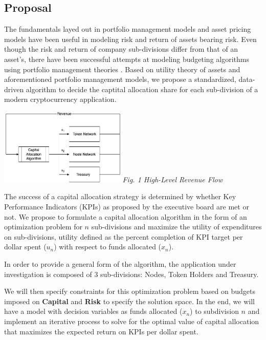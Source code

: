 \documentclass[conference,letterpaper]{IEEEtran}
\begin{document}
        \subsection{Proposal}
            The fundamentals layed out in portfolio management models and asset pricing
            models \cite{portfolioSelection} have been useful in modeling risk and return
            of assets bearing risk. Even though the risk and return of company
            sub-divisions differ from that of an asset's, there have been successful
            attempts at modeling budgeting algorithms using portfolio management theories
            \cite{cetingoz}. Based on utility theory of assets and aforementioned
            portfolio management models, we propose a standardized, data-driven algorithm
            to decide the captital allocation share for each sub-division of a modern
            cryptocurrency application.
            \begin{center}
                \includegraphics[width=0.45\textwidth]{assets/high_level_capital_allocation.png}
                \textit{Fig. 1 High-Level Revenue Flow}
            \end{center}
            The success of a capital allocation strategy is determined by whether Key
            Performance Indicators (KPIs) as proposed by the executive board are met or
            not. We propose to formulate a capital allocation algorithm in the form of an
            optimization problem for $n$ sub-divisions and maximize the utility of
            expenditures on sub-divisions, utility defined as the percent completion of
            KPI target per dollar spent ($u_n$) with respect to funds allocated ($x_n$). 
            
            In order to provide a general form of the algorithm, the application under
            investigation is composed of 3 sub-divisions: Nodes, Token Holders and
            Treasury.
            
            We will then specify constraints for this optimization problem based on
            budgets imposed on \textbf{Capital} and \textbf{Risk} to specify the solution
            space. In the end, we will have a model with decision variables as funds
            allocated ($x_n$) to subdivision $n$ and implement an iterative process to
            solve for the optimal value of capital allocation that maximizes the expected
            return on KPIs per dollar spent.
        
\end{document}
